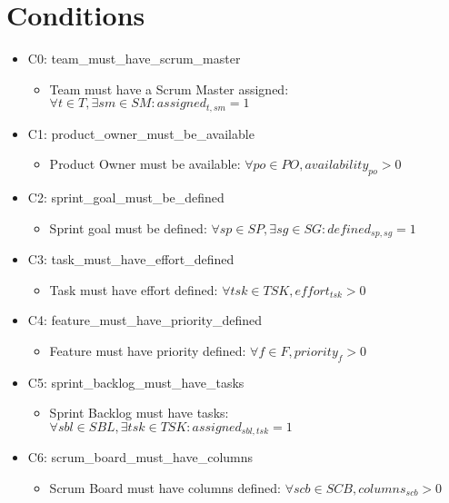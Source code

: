 \documentclass{article}
\begin{document}
\section{Conditions}
\begin{itemize}
    \item C0: team\_must\_have\_scrum\_master
        \begin{itemize}
            \item Team must have a Scrum Master assigned: $\forall t \in T, \exists sm \in SM: assigned_{t,sm} = 1$
        \end{itemize}
    \item C1: product\_owner\_must\_be\_available
        \begin{itemize}
            \item Product Owner must be available: $\forall po \in PO, availability_{po} > 0$
        \end{itemize}
    \item C2: sprint\_goal\_must\_be\_defined
        \begin{itemize}
            \item Sprint goal must be defined: $\forall sp \in SP, \exists sg \in SG: defined_{sp,sg} = 1$
        \end{itemize}
    \item C3: task\_must\_have\_effort\_defined
        \begin{itemize}
            \item Task must have effort defined: $\forall tsk \in TSK, effort_{tsk} > 0$
        \end{itemize}
    \item C4: feature\_must\_have\_priority\_defined
        \begin{itemize}
            \item Feature must have priority defined: $\forall f \in F, priority_f > 0$
        \end{itemize}
    \item C5: sprint\_backlog\_must\_have\_tasks
        \begin{itemize}
            \item Sprint Backlog must have tasks: $\forall sbl \in SBL, \exists tsk \in TSK: assigned_{sbl,tsk} = 1$
        \end{itemize}
    \item C6: scrum\_board\_must\_have\_columns
        \begin{itemize}
            \item Scrum Board must have columns defined: $\forall scb \in SCB, columns_{scb} > 0$

\end{itemize}
\end{itemize}
\end{document}
